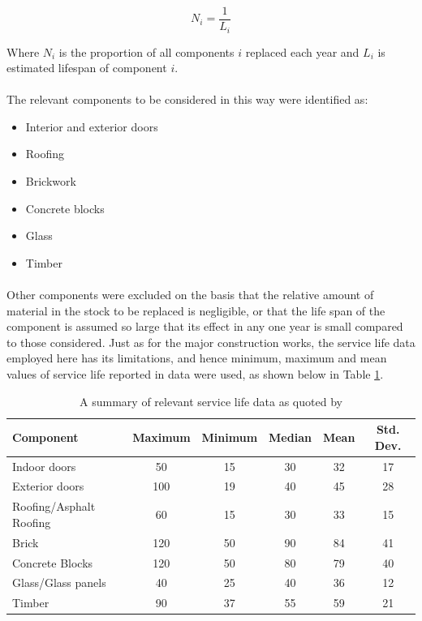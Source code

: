 \documentclass[12pt]{article}
\begin{document}
\begin{equation}
    N_i = \frac{1}{L_i}
\end{equation}

\noindent
Where $N_i$  is the proportion of all components $i$ replaced each year and $L_i$ is estimated lifespan of component $i$.

\paragraph{}
The relevant components to be considered in this way were identified as:

\begin{multicols}{2}
\begin{itemize}
\itemsep0em
	\item Interior and exterior doors
	\item Roofing
	\item Brickwork
	\item Concrete blocks
	\item Glass
	\item Timber
\end{itemize}
\end{multicols}

\paragraph{}
Other components were excluded on the basis that the relative amount of material in the stock to be replaced is negligible, or that the life span of the component is assumed so large that its effect in any one year is small compared to those considered. Just as for the major construction works, the service life data employed here has its limitations, and hence minimum, maximum and mean values of service life reported in data were used, as shown below in Table \ref{tab:Lifespans}.

\begingroup
\linespread{1}
\begin{table}[htbp]
  \centering
  \caption{A summary of relevant service life data as quoted by \citet{Dixit2019-bj}}
    \begin{tabular}{lccccc}
    \toprule
    \textbf{Component} & \textbf{Maximum} & \textbf{Minimum} & \textbf{Median} & \textbf{Mean} & \textbf{Std. Dev.} \\
    \midrule
    Indoor doors & 50    & 15    & 30    & 32    & 17 \\
    Exterior doors & 100   & 19    & 40    & 45    & 28 \\
    Roofing/Asphalt Roofing & 60    & 15    & 30    & 33    & 15 \\
    Brick & 120   & 50    & 90    & 84    & 41 \\
    Concrete Blocks & 120   & 50    & 80    & 79    & 40 \\
    Glass/Glass panels & 40    & 25    & 40    & 36    & 12 \\
    Timber & 90    & 37    & 55    & 59    & 21 \\
    \bottomrule
    \end{tabular}%
  \label{tab:Lifespans}%
\end{table}%
\endgroup
\end{document}
